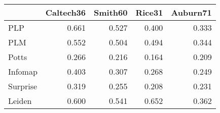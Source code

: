 \begin{tabular}{lrrrr}
\toprule
{} & Caltech36 & Smith60 & Rice31 & Auburn71 \\
\midrule
PLP      &     0.661 &   0.527 &  0.400 &    0.333 \\
PLM      &     0.552 &   0.504 &  0.494 &    0.344 \\
Potts    &     0.266 &   0.216 &  0.164 &    0.209 \\
Infomap  &     0.403 &   0.307 &  0.268 &    0.249 \\
Surprise &     0.319 &   0.255 &  0.208 &    0.231 \\
Leiden   &     0.600 &   0.541 &  0.652 &    0.362 \\
\bottomrule
\end{tabular}
